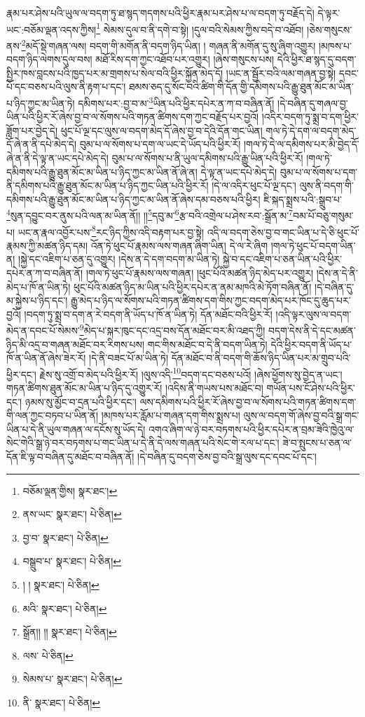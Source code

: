 རྣམ་པར་ཤེས་པའི་ཡུལ་ལ་བདག་ཏུ་ཐ་སྙད་གདགས་པའི་ཕྱིར་རྣམ་པར་ཤེས་པ་ལ་བདག་ཏུ་བརྗོད་དེ། དེ་ལྟར་ཡང་:བཅོམ་ལྡན་འདས་ཀྱིས།\footnote{བཅོམ་ལྡན་གྱིས།  སྣར་ཐང་། } སེམས་དུལ་བ་ནི་དགེ་བ་སྟེ། །དུལ་བའི་སེམས་ཀྱིས་བདེ་བ་འཐོབ། །ཅེས་གསུངས་ནས་\footnote{ནས་ཡང་  སྣར་ཐང་།  པེ་ཅིན། }མདོ་སྡེ་གཞན་ལས། བདག་གི་མགོན་ནི་བདག་ཉིད་ཡིན། །
གཞན་ནི་མགོན་དུ་སུ་ཞིག་འགྱུར། །མཁས་པ་བདག་ཉིད་ལེགས་དུལ་བས། མཐོ་རིས་དག་ཀྱང་འཐོབ་པར་འགྱུར། །ཞེས་གསུངས་པས། དེའི་ཕྱིར་ཐ་སྙད་དུ་བདག་སྤྱིར་ཁས་བླངས་པའི་ཁྱད་པར་མ་གྲགས་པ་སེལ་བའི་ཕྱིར་སྐྱོན་མེད་དོ། །ཡང་ན་སྦྱོར་བའི་ལམ་གཞན་བྱ་སྟེ། དབང་པོ་དང་བཅས་པའི་ལུས་ནི་རྟག་པ་དང་། ཐམས་ཅད་དུ་སོང་བའི་ཚིག་གི་དོན་གྱི་དམིགས་པའི་རྒྱུ་ཐུན་མོང་མ་ཡིན་པ་ཉིད་ཀྱང་མ་ཡིན་ཏེ། དམིགས་པར་:བྱ་བ་མ་\footnote{བྱ་བ་  སྣར་ཐང་།  པེ་ཅིན། }ཡིན་པའི་ཕྱིར་དཔེར་ན་ཀ་བ་བཞིན་ནོ། །དེ་བཞིན་དུ་གཞལ་བྱ་ཡིན་པའི་ཕྱིར་རོ་ཞེས་བྱ་བ་ལ་སོགས་པའི་གཏན་ཚིགས་དག་ཀྱང་བརྗོད་པར་བྱའོ། །འདིར་བདག་ཏུ་སྨྲ་བ་དག་ཕྱིར་ཟློག་པར་བྱེད་དེ། ཕུང་པོ་ལྔ་དང་ལུས་ལ་བདག་མེད་དོ་ཞེས་བྱ་བ་དེའི་དོན་གང་ཡིན། གལ་ཏེ་དེ་དག་ལ་བདག་མེད་དོ་ཞེ་ན་ནི་དཔེ་མེད་དེ། བུམ་པ་ལ་སོགས་པ་དག་ལ་ཡང་དེ་ཡོད་པའི་ཕྱིར་རོ། །གལ་ཏེ་དེ་ལ་དམིགས་པར་མི་བྱེད་དོ་ཞེ་ན་ནི་དེ་ལྟ་ན་ཡང་དཔེ་མེད་དེ། བུམ་པ་ལ་སོགས་པ་ནི་ཡུལ་དམིགས་པའི་རྒྱུ་ཡིན་པའི་ཕྱིར་རོ། །གལ་ཏེ་དམིགས་པའི་རྒྱུ་ཐུན་མོང་མ་ཡིན་པ་ཉིད་ཀྱང་མ་ཡིན་ནོ་ཞེ་ན། དེ་ལྟ་ན་ཡང་དཔེ་མེད་དེ། བུམ་པ་ལ་སོགས་པ་དག་ནི་དམིགས་པའི་རྒྱུ་ཐུན་མོང་མ་ཡིན་པ་ཉིད་ཀྱང་ཡིན་པའི་ཕྱིར་རོ། །དེ་ལ་འདིར་ཕུང་པོ་ལྔ་དང་། ལུས་ནི་བདག་གི་དམིགས་པའི་རྒྱུ་ཐུན་མོང་མ་ཡིན་པ་ཉིད་ཀྱང་མ་ཡིན་ནོ་ཞེས་དམ་བཅས་པའི་ཕྱིར། ཇི་སྐད་སྨྲས་པའི་:སྒྲུབ་པ་\footnote{བསྒྲུབ་པ་  སྣར་ཐང་།  པེ་ཅིན། }སུན་དབྱུང་བར་ནུས་པའི་ལན་མ་ཡིན་ནོ།། །།\footnote{། །  སྣར་ཐང་།  པེ་ཅིན། }དབུ་མ་\footnote{མའི་  སྣར་ཐང་།  པེ་ཅིན། }རྩ་བའི་འགྲེལ་པ་ཤེས་རབ་:སྒྲོན་མ་\footnote{སྒྲོན།། །།  སྣར་ཐང་།  པེ་ཅིན། }བམ་པོ་བཅུ་གསུམ་པ། ཡང་ན་རྣལ་འབྱོར་པས་\footnote{ལས་  པེ་ཅིན། }རང་ཉིད་ཀྱིས་འདི་བརྟག་པར་བྱ་སྟེ། འདི་ལ་བདག་ཅེས་བྱ་བ་གང་ཡིན་པ་དེ་ཅི་ཕུང་པོ་རྣམས་ཀྱི་མཚན་ཉིད་དམ། འོན་ཏེ་ཕུང་པོ་རྣམས་ལས་གཞན་ཞིག་ཡིན། དེ་ལ་རེ་ཞིག །གལ་ཏེ་ཕུང་པོ་བདག་ཡིན་ན། །སྐྱེ་དང་འཇིག་པ་ཅན་དུ་འགྱུར། །དེས་ན་དེ་དག་བདག་མ་ཡིན་ཏེ། སྐྱེ་བ་དང་འཇིག་པ་ཅན་ཡིན་པའི་ཕྱིར་དཔེར་ན་ཀ་བ་བཞིན་ནོ། །གལ་ཏེ་ཕུང་པོ་རྣམས་ལས་གཞན། །ཕུང་པོའི་མཚན་ཉིད་མེད་པར་འགྱུར། །དེས་ན་དེ་ནི་མེད་པ་ཁོ་ན་ཡིན་ཏེ། ཕུང་པོའི་མཚན་ཉིད་མ་ཡིན་པའི་ཕྱིར་དཔེར་ན་ནམ་མཁའི་མེ་ཏོག་བཞིན་ནོ། །དེ་བཞིན་དུ་མ་སྐྱེས་པ་ཉིད་དང་། རྒྱུ་མེད་པ་ཉིད་ལ་སོགས་པའི་གཏན་ཚིགས་དག་གིས་ཀྱང་བདག་མེད་པར་ཁོང་དུ་ཆུད་པར་བྱའོ། །བདག་ཏུ་སྨྲ་བ་དག་ན་རེ་བདག་ནི་ཡོད་པ་ཁོ་ན་ཡིན་ཏེ། དོན་མཐོང་བའི་ཕྱིར་རོ། །འདི་ལྟར་ལུས་ལ་བདག་མེད་ན་དབང་པོ་སེམས་\footnote{སེམས་པ་  སྣར་ཐང་།  པེ་ཅིན། }མེད་པ་སྐར་ཁུང་དང་འདྲ་བས་དོན་མཐོང་བར་མི་འཐད་ཀྱི། བདག་དེས་ནི་དེ་དང་མཚན་ཉིད་མི་འདྲ་བ་གཞན་མཐོང་བར་རིགས་པས། གང་གིས་མཐོང་བ་དེ་ནི་བདག་ཡིན་ཏེ། དེའི་ཕྱིར་བདག་ནི་ཡོད་པ་ཁོ་ན་ཡིན་ནོ་ཞེས་ཟེར་རོ། །དེ་ནི་བཟང་པོ་མ་ཡིན་ཏེ། དོན་མཐོང་བ་ནི་བདག་གི་ཆོས་ཉིད་ཡིན་པར་མ་གྲུབ་པའི་ཕྱིར་དང་། རྗེས་སུ་འགྲོ་བ་མེད་པའི་ཕྱིར་རོ། །ལུས་འདི་\footnote{ནི་  སྣར་ཐང་།  པེ་ཅིན། }བདག་དང་བཅས་པའོ། །ཞེས་ཕྱོགས་སུ་བྱེད་ན་ཡང་། གཏན་ཚིགས་ཐུན་མོང་མ་ཡིན་པ་ཉིད་དུ་འགྱུར་རོ། །འདིས་ནི་གཡས་པས་མཐོང་བ། གཡོན་པས་ངོ་ཤེས་པའི་ཕྱིར་དང་། ཉམས་སུ་མྱོང་བ་དྲན་པའི་ཕྱིར་དང་། ལས་དམིགས་པའི་ཕྱིར་རོ་ཞེས་བྱ་བ་ལ་སོགས་པའི་གཏན་ཚིགས་དག་གི་ལན་ཀྱང་བཏབ་པ་ཡིན་ནོ། །མཁས་པར་རློམ་པ་གཞན་དག་གིས་སྨྲས་པ། ལུས་ལ་བདག་གོ་ཞེས་བྱ་བའི་སྒྲ་གང་ཡིན་པ་དེ་ནི་ཡུལ་གཞན་ལ་དངོས་སུ་ཡོད་དེ། འགའ་ཞིག་ལ་ཉེ་བར་བཏགས་པའི་ཕྱིར་དཔེར་ན་བྲམ་ཟེའི་ཁྱེའུ་ལ་སེང་གེའི་སྒྲ་ཉེ་བར་བཏགས་པ་གང་ཡིན་པ་དེ་ནི་དེ་ལས་གཞན་པའི་སེང་གེ་རལ་པ་དང་། ཟེ་བ་སྤུངས་པ་ཅན་ལ་དོན་ཇི་ལྟ་བ་བཞིན་དུ་མཐོང་བ་བཞིན་ནོ། །དེ་བཞིན་དུ་བདག་ཅེས་བྱ་བའི་སྒྲ་ལུས་དང་དབང་པོ་དང་། 